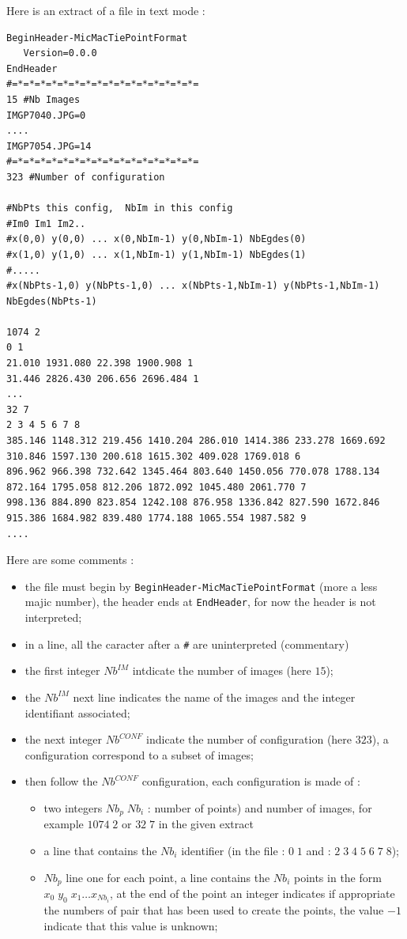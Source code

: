 Here is an extract of a file in text mode :


{\tiny
\begin{verbatim}
BeginHeader-MicMacTiePointFormat
   Version=0.0.0
EndHeader
#=*=*=*=*=*=*=*=*=*=*=*=*=*=*=*=*=
15 #Nb Images
IMGP7040.JPG=0
....
IMGP7054.JPG=14
#=*=*=*=*=*=*=*=*=*=*=*=*=*=*=*=*=
323 #Number of configuration

#NbPts this config,  NbIm in this config
#Im0 Im1 Im2..
#x(0,0) y(0,0) ... x(0,NbIm-1) y(0,NbIm-1) NbEgdes(0)
#x(1,0) y(1,0) ... x(1,NbIm-1) y(1,NbIm-1) NbEgdes(1)
#.....
#x(NbPts-1,0) y(NbPts-1,0) ... x(NbPts-1,NbIm-1) y(NbPts-1,NbIm-1) NbEgdes(NbPts-1)

1074 2 
0 1 
21.010 1931.080 22.398 1900.908 1 
31.446 2826.430 206.656 2696.484 1 
...
32 7 
2 3 4 5 6 7 8 
385.146 1148.312 219.456 1410.204 286.010 1414.386 233.278 1669.692 310.846 1597.130 200.618 1615.302 409.028 1769.018 6 
896.962 966.398 732.642 1345.464 803.640 1450.056 770.078 1788.134 872.164 1795.058 812.206 1872.092 1045.480 2061.770 7 
998.136 884.890 823.854 1242.108 876.958 1336.842 827.590 1672.846 915.386 1684.982 839.480 1774.188 1065.554 1987.582 9 
....
\end{verbatim}
}


Here are some comments :

\begin{itemize}
   \item the file must begin by {\tt BeginHeader-MicMacTiePointFormat} (more a less majic number), the header ends
         at {\tt EndHeader}, for now the header is not interpreted;

   \item in a line, all the caracter after a  {\tt \#} are uninterpreted (commentary)
   \item the first integer $Nb^{IM}$ intdicate the number of images  (here $15$);
   \item the $Nb^{IM}$ next line indicates  the name of the images  and the integer identifiant associated;
   \item the next integer $Nb^{CONF}$ indicate the number of configuration (here $323$), a configuration correspond
         to a subset of images;
   \item then follow the  $Nb^{CONF}$ configuration, each configuration is made of :
   \begin{itemize}
      \item  two integers $Nb_{p} \; Nb_{i}$  : number of points) and  number of images, for example $1074 \; 2$ 
             or $32 \; 7 $ in the given extract
      \item a line that contains the  $Nb_{i}$ identifier (in the file : $0 \; 1$ and : $2 \; 3 \; 4 \; 5 \; 6 \; 7 \; 8 $);
      \item $Nb_{p}$ line one for each point, a line contains the $ Nb_{i}$ points in the form 
            $x_0 \; y_0 \; x_1 \dots x_{Nb_{i}}$, at the end of the point an integer indicates  if appropriate
            the numbers of  pair that has been used to create the points, the value $-1$ indicate that this
            value is unknown;
   \end{itemize}

\end{itemize}


